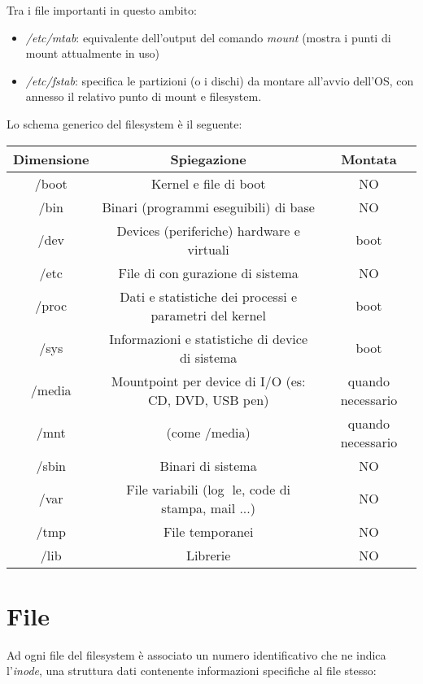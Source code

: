 Tra i file importanti in questo ambito:
\begin{itemize}
    \item \textit{/etc/mtab}: equivalente dell'output del comando \textit{mount} (mostra i punti di mount attualmente in uso)
    \item \textit{/etc/fstab}: specifica le partizioni (o i dischi) da montare all'avvio dell'OS, con annesso il relativo punto di mount e filesystem.
\end{itemize}

Lo schema generico del filesystem è il seguente:

\begin{center}
	\begin{tabular}{| c | c | c |}
		\hline
		\textbf{Dimensione}& \textbf{Spiegazione} & \textbf{Montata} \\ \hline
		/boot & Kernel e file di boot & NO \\
		\hline
		/bin & Binari (programmi eseguibili) di base & NO \\ 
		\hline
		/dev & Devices (periferiche) hardware e virtuali & boot \\ 
		\hline
		/etc & File di congurazione di sistema & NO \\
		\hline
		/proc & Dati e statistiche dei processi e parametri del kernel & boot \\
		\hline
		/sys & Informazioni e statistiche di device di sistema & boot \\
		\hline
		/media & Mountpoint per device di I/O (es:  CD, DVD, USB pen) & quando necessario \\
		\hline
		/mnt & (come /media) & quando necessario \\
		\hline
		/sbin & Binari di sistema & NO \\
		\hline
		/var & File variabili (log le, code di stampa, mail ...) & NO \\
		\hline
		/tmp & File temporanei & NO \\
		\hline
		/lib & Librerie & NO \\
		\hline
	\end{tabular}
\end{center}

\section{File}
Ad ogni file del filesystem è associato un numero identificativo che ne indica l'\textit{inode}, una struttura dati contenente informazioni specifiche al file stesso:


